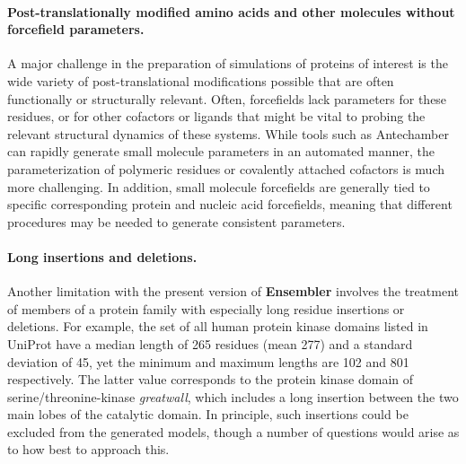 \documentclass[10pt,letterpaper]{article}
\begin{document}
\paragraph{Post-translationally modified amino acids and other molecules without forcefield parameters.}
A major challenge in the preparation of simulations of proteins of interest is the wide variety of post-translational modifications possible that are often functionally or structurally relevant.
Often, forcefields lack parameters for these residues, or for other cofactors or ligands that might be vital to probing the relevant structural dynamics of these systems.
While tools such as Antechamber~\cite{gaff,gaff2} can rapidly generate small molecule parameters in an automated manner, the parameterization of polymeric residues or covalently attached cofactors is much more challenging.
In addition, small molecule forcefields are generally tied to specific corresponding protein and nucleic acid forcefields, meaning that different procedures may be needed to generate consistent parameters.

\paragraph{Long insertions and deletions.}
Another limitation with the present version of {\bf Ensembler} involves the treatment of members of a protein family with especially long residue insertions or deletions.
For example, the set of all human protein kinase domains listed in UniProt have a median length of 265 residues (mean 277) and a standard deviation of 45, yet the minimum and maximum lengths are 102 and 801 respectively.
The latter value corresponds to the protein kinase domain of serine/threonine-kinase \emph{greatwall}, which includes a long insertion between the two main lobes of the catalytic domain.
In principle, such insertions could be excluded from the generated models, though a number of questions would arise as to how best to approach this.
\end{document}
